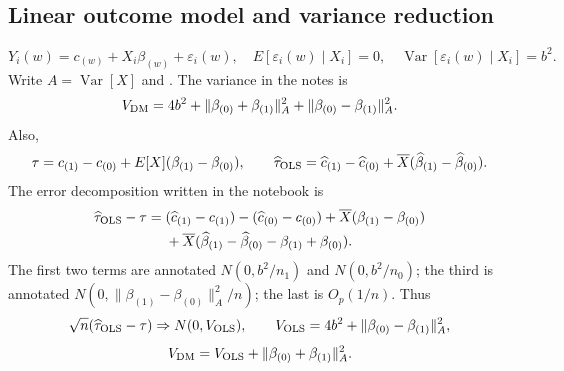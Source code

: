 \subsection{Linear outcome model and variance reduction}
\[
Y_i(w)=c_{(w)}+X_i\beta_{(w)}+\varepsilon_i(w),\quad
E[\varepsilon_i(w)\mid X_i]=0,\quad
\operatorname{Var}[\varepsilon_i(w)\mid X_i]=b^2.
\]
 Write $A=\operatorname{Var}[X]$ and . The variance in the notes is
\[
V_{\rm DM}=4b^2+\|\beta_{(0)}+\beta_{(1)}\|_A^2
 +\|\beta_{(0)}-\beta_{(1)}\|_A^2.
\]
Also,
\[
\tau=c_{(1)}-c_{(0)}+E[X](\beta_{(1)}-\beta_{(0)}),\qquad
\widehat\tau_{\rm OLS}=\widehat c_{(1)}-\widehat c_{(0)}
 +\overline X(\widehat\beta_{(1)}-\widehat\beta_{(0)}).
\]
The error decomposition written in the notebook is
\begin{align*}
\widehat\tau_{\rm OLS}-\tau={}&(\widehat c_{(1)}-c_{(1)})-(\widehat c_{(0)}-c_{(0)})
 +\overline X(\beta_{(1)}-\beta_{(0)})\\
&+\overline X(\widehat\beta_{(1)}-\widehat\beta_{(0)}-\beta_{(1)}+\beta_{(0)}).
\end{align*}
The first two terms are annotated $N(0,b^2/n_1)$ and $N(0,b^2/n_0)$; the third is annotated $N(0,\|\beta_{(1)}-\beta_{(0)}\|_A^2/n)$; the last is $O_p(1/n)$.  Thus
\[
\sqrt n(\widehat\tau_{\rm OLS}-\tau)\Rightarrow N(0,V_{\rm OLS}),\qquad
V_{\rm OLS}=4b^2+\|\beta_{(0)}-\beta_{(1)}\|_A^2,
\]
\[
V_{\rm DM}=V_{\rm OLS}+\|\beta_{(0)}+\beta_{(1)}\|_A^2.
\]

